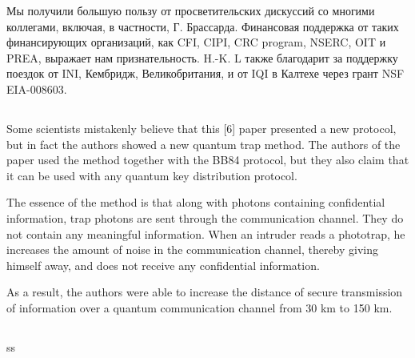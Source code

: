 Мы получили большую пользу от просветительских дискуссий со многими коллегами, включая, в частности, Г. Брассарда. Финансовая поддержка от таких финансирующих организаций, как CFI, CIPI, CRC program, NSERC, OIT и PREA, выражает нам признательность. H.-K. L также благодарит за поддержку поездок от INI, Кембридж, Великобритания, и от IQI в Калтехе через грант NSF EIA-008603.

\subsection{\review}
Some scientists mistakenly believe that this [6] paper presented a new protocol, but in fact the authors showed a new quantum trap method. The authors of the paper used the method together with the BB84 protocol, but they also claim that it can be used with any quantum key distribution protocol.

The essence of the method is that along with photons containing confidential information, trap photons are sent through the communication channel. They do not contain any meaningful information. When an intruder reads a phototrap, he increases the amount of noise in the communication channel, thereby giving himself away, and does not receive any confidential information.

As a result, the authors were able to increase the distance of secure transmission of information over a quantum communication channel from 30 km to 150 km.


\subsection{\dic}
ss